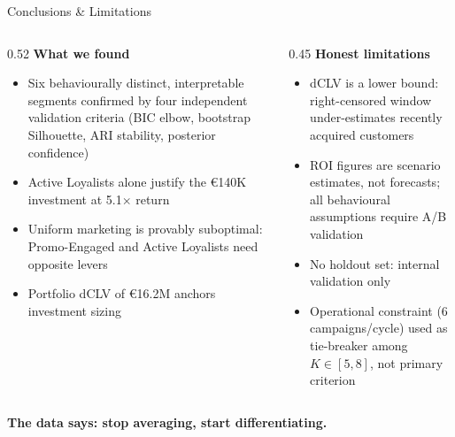 \documentclass[aspectratio=169,10pt]{beamer}
\begin{document}
\begin{frame}{Conclusions \& Limitations}
\begin{columns}[T]
  \begin{column}{0.52\textwidth}
    \textbf{What we found}
    \begin{itemize}
      \item Six behaviourally distinct, interpretable segments confirmed
        by four independent validation criteria (BIC elbow,
        bootstrap Silhouette, ARI stability, posterior confidence)
      \item Active Loyalists alone justify the \euro140K investment at 5.1$\times$ return
      \item Uniform marketing is provably suboptimal: Promo-Engaged
        and Active Loyalists need opposite levers
      \item Portfolio dCLV of \euro16.2M anchors investment sizing
    \end{itemize}
  \end{column}
  \begin{column}{0.45\textwidth}
    \textbf{Honest limitations}
    \begin{itemize}
      \item dCLV is a lower bound: right-censored window
        under-estimates recently acquired customers
      \item ROI figures are scenario estimates, not forecasts;
        all behavioural assumptions require A/B validation
      \item No holdout set: internal validation only
      \item Operational constraint (6 campaigns/cycle) used as
        tie-breaker among $K\in[5,8]$, not primary criterion
    \end{itemize}
  \end{column}
\end{columns}
\vspace{0.5em}
\centering
{\large\color{accent}\textbf{The data says: stop averaging, start differentiating.}}
\end{frame}
\end{document}
